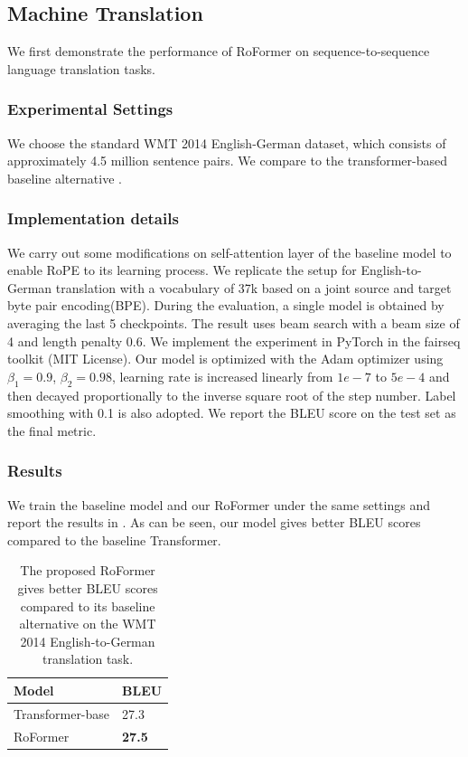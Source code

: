 \documentclass{article}
\begin{document}
\subsection{Machine Translation}\label{subsec:mt}
We first demonstrate the performance of RoFormer on sequence-to-sequence language translation tasks. 
\subsubsection{Experimental Settings} 
We choose the standard WMT 2014 English-German dataset\cite{mtdataset}, which consists of approximately 4.5 million sentence pairs. We compare to the transformer-based baseline alternative \cite{Vaswani:2017}. 
\subsubsection{Implementation details} 
We carry out some modifications on  self-attention layer of the baseline model \cite{Vaswani:2017} to enable RoPE to its learning process. We replicate the setup for English-to-German translation with a vocabulary of 37k based on a joint source and target byte pair encoding(BPE)\cite{bpe}. During the evaluation, a single model is obtained by averaging the last 5 checkpoints. The result uses beam search with a beam size of 4 and length penalty 0.6.  We implement the experiment in PyTorch in the fairseq toolkit (MIT License)\cite{fairseq}.  Our model is optimized with the Adam optimizer using $\beta_1 = 0.9$, $\beta_2 = 0.98$, learning rate is increased linearly from $1e-7$ to $5e-4$ and then decayed proportionally to the inverse square root of the step number. Label smoothing with 0.1 is also adopted. We report the BLEU\cite{bleu} score on the test set as the final metric.

\subsubsection{Results} 
We train the baseline model and our RoFormer under the same settings and report the results in . As can be seen, our model gives better BLEU scores compared to the baseline Transformer. 

\begin{table}
	\caption{The proposed RoFormer gives better BLEU scores compared to its baseline alternative \cite{Vaswani:2017} on the WMT 2014 English-to-German translation task\cite{mtdataset}.}
	\label{tb:mt}
	\centering
	\begin{tabular}{ll}
		\toprule
		Model     & BLEU \\
		\midrule
		Transformer-base\cite{Vaswani:2017} & 27.3\\
		RoFormer & \textbf{27.5} \\ 
		\bottomrule
	\end{tabular}
\end{table}
\end{document}
